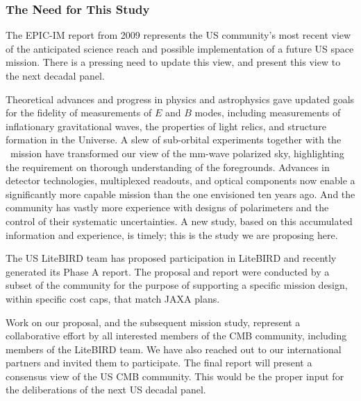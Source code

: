 \subsubsection{The Need for This Study} 

\vspace{-0.05in}

The EPIC-IM report from 2009 represents the US community's most recent view of the anticipated 
science reach and possible implementation of a future US space mission. There is a pressing need 
to update this view, and present this view to the next decadal panel.  

Theoretical advances and progress in physics and astrophysics gave updated 
goals for the fidelity of measurements of $E$ and $B$ modes, including measurements of inflationary 
gravitational waves, the properties of light relics, and structure formation in the Universe. A 
slew of sub-orbital experiments together with the \planck\ mission have 
transformed our view of the mm-wave polarized sky, highlighting the requirement on 
thorough understanding of the foregrounds. Advances in detector technologies, multiplexed readouts,
and optical components now enable a significantly more capable mission than the one envisioned
ten years ago. And the community has vastly more experience with designs of polarimeters and 
the control of their systematic uncertainties.  A new study, based on this accumulated information and 
experience, is timely; this is the study we are proposing here. 

The US LiteBIRD team has proposed participation in LiteBIRD and recently generated its Phase A 
report. The proposal and report were conducted by 
a subset of the community for the purpose of supporting a specific mission design, within specific 
cost caps, that match JAXA plans. 

Work on our proposal, and 
the subsequent mission study, represent a collaborative effort by all interested members of the 
CMB community, including members of the LiteBIRD team. We have also reached out to our international partners 
and invited them to participate. The final report will present a consensus view of the US CMB community. 
This would be the proper input for the deliberations of the next US decadal panel. 



























